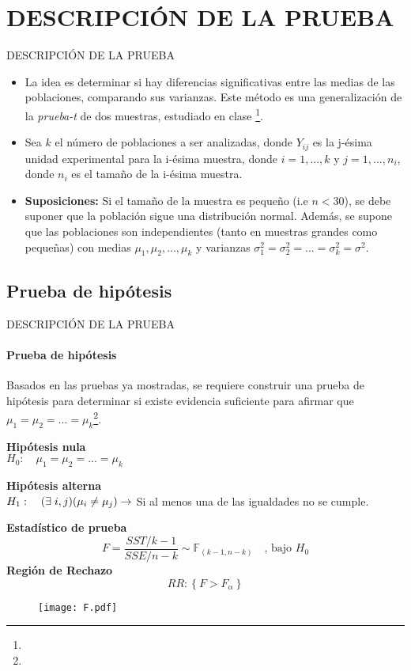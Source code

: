 \section{DESCRIPCIÓN DE LA PRUEBA}
\begin{frame}{DESCRIPCIÓN DE LA PRUEBA}
\begin{itemize}
    \item La idea es determinar si hay diferencias significativas entre las medias de las poblaciones, comparando sus varianzas. Este método es una generalización de la \textit{prueba-t} de dos muestras, estudiado en clase \footnote{}.
    \item Sea $k$ el número de poblaciones a ser analizadas, donde $Y_{ij}$ es la j-ésima unidad experimental para la i-ésima muestra, donde $i=1,...,k$ y $j=1,...,n_i$, donde $n_i$ es el tamaño de la i-ésima muestra.
    \item \textbf{Suposiciones:} Si el tamaño de la muestra es pequeño (i.e $n<30$), se debe suponer que la población sigue una distribución normal. Además, se supone que las poblaciones son independientes (tanto en muestras grandes como pequeñas) con medias $\mu_1,\mu_2,...,\mu_k$ y varianzas $\sigma_1^2=\sigma_2^2=...=\sigma_k^2=\sigma^2$.
    
\end{itemize}
\end{frame}
\subsection{Prueba de hipótesis}
\begin{frame}{DESCRIPCIÓN DE LA PRUEBA}
    \framesubtitle{Prueba de hipótesis}
    Basados en las pruebas ya mostradas, se requiere construir una prueba de hipótesis para determinar si existe evidencia suficiente para afirmar que $\mu_1=\mu_2=...=\mu_k$\footnote{}.\vspace{2mm}
    
    \textbf{Hipótesis nula\\}
    $H_0:\quad\mu_1=\mu_2=...=\mu_k$
    \vspace{2mm}
    
    \textbf{Hipótesis alterna\\}
    $H_1:\quad(\exists\hspace{1mm} i,j)(\mu_i\ne\mu_j)\rightarrow$ Si al menos una de las igualdades no se cumple.\vspace{2mm}
    
    \begin{multicols}{2}
    \textbf{Estadístico de prueba\\}
    \[F=\dfrac{SST\Big/k-1}{SSE\Big/n-k}\sim\mathbb{F}_{(k-1,n-k)}\quad\text{, bajo } H_0\]
    \textbf{Región de Rechazo}
        \[RR:\left\{F>F_\alpha\right\}\]
        \columnbreak
        \begin{figure}[H]
            \centering
            \texttt{[image: F.pdf]}
        \end{figure}
    \end{multicols}
\end{frame}
